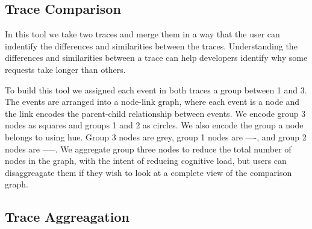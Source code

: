 \subsection{Trace Comparison}

In this tool we take two traces and merge them in a way that the user can indentify the
differences and similarities between the traces. Understanding the differences and similarities
between a trace can help developers identify why some requests take longer than others. 

To build this tool we assigned each event in both traces a group between 1 and 3. The events are arranged into a node-link graph,
where each event is a node and the link encodes the parent-child relationship between events. We encode group 3 nodes as squares and groups 1 and 2 as circles.
We also encode the group a node belongs to using hue. Group 3 nodes are grey, group 1 nodes are ----, and group 2 nodes are -----. We aggregate
group three nodes to reduce the total number of nodes in the graph, with the intent of reducing cognitive load, but users can disaggreagate them if
they wish to look at a complete view of the comparison graph.

\subsection{Trace Aggreagation}
